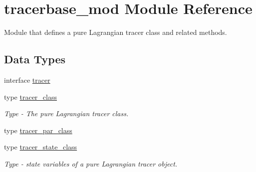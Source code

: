 \hypertarget{namespacetracerbase__mod}{}\section{tracerbase\+\_\+mod Module Reference}
\label{namespacetracerbase__mod}


Module that defines a pure Lagrangian tracer class and related methods.  


\subsection*{Data Types}
\begin{DoxyCompactItemize}
\item 
interface \mbox{\hyperlink{interfacetracerbase__mod_1_1tracer}{tracer}}
\item 
type \mbox{\hyperlink{structtracerbase__mod_1_1tracer__class}{tracer\+\_\+class}}
\begin{DoxyCompactList}\small\item\em Type -\/ The pure Lagrangian tracer class. \end{DoxyCompactList}\item 
type \mbox{\hyperlink{structtracerbase__mod_1_1tracer__par__class}{tracer\+\_\+par\+\_\+class}}
\item 
type \mbox{\hyperlink{structtracerbase__mod_1_1tracer__state__class}{tracer\+\_\+state\+\_\+class}}
\begin{DoxyCompactList}\small\item\em Type -\/ state variables of a pure Lagrangian tracer object. \end{DoxyCompactList}\end{DoxyCompactItemize}
